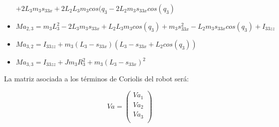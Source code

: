 \begin{itemize}
	$ + 2L_{3}m_{3}s_{33x}+ 2L_{2}L_{3}m_{3}cos(q_{3}-2L_{2}m_{3}s_{33x}cos(q_{3})$ \\ \vspace{0.2cm}
	
	\item $Ma_{2,3}=m_{3}L_{3}^{2}- 2L_{3}m_{3}s_{33x}+L_{2}L_{3}m_{3}cos(q_{3})+m_{3}s_{33x}^{2}-L_{2}m_{3}s_{33x}cos(q_{3})+I_{33zz}$ \\ \vspace{0.2cm}
	
	\item $Ma_{3,2}=I_{33zz}+m_{3}(L_{3}-s_{33x})(L_{3}-s_{33x}+L_{2}cos(q_{3}))$ \\ \vspace{0.2cm}
	
	\item $Ma_{3,3}=I_{33zz}+Jm_{3}R_{3}^{2}+m_{3}(L_{3}-s_{33x})^{2}$ \\ \vspace{0.2cm}
	
\end{itemize}



La matriz asociada a los términos de Coriolis del robot será:

\[
Va=
\begin{pmatrix}
Va_{1}\\

Va_{2}\\

Va_{3}\\
\end{pmatrix} \]

